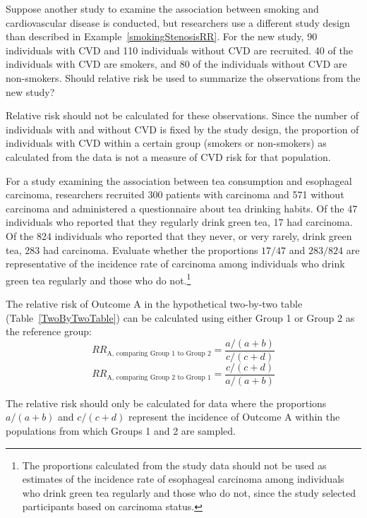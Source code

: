 \begin{example}{Suppose another study to examine the association between smoking and cardiovascular disease is conducted, but researchers use a different study design than described in Example~\ref{smokingStenosisRR}. For the new study, 90 individuals with CVD and 110 individuals without CVD are recruited. 40 of the individuals with CVD are smokers, and 80 of the individuals without CVD are non-smokers. Should relative risk be used to summarize the observations from the new study?}
	
Relative risk should not be calculated for these observations. Since the number of individuals with and without CVD is fixed by the study design, the proportion of individuals with CVD within a certain group (smokers or non-smokers) as calculated from the data is not a measure of CVD risk for that population.
\end{example}

\begin{exercise} For a study examining the association between tea consumption and esophageal carcinoma, researchers recruited 300 patients with carcinoma and 571 without carcinoma and administered a questionnaire about tea drinking habits. Of the 47 individuals who reported that they regularly drink green tea, 17 had carcinoma. Of the 824 individuals who reported that they never, or very rarely, drink green tea, 283 had carcinoma. Evaluate whether the proportions $17/47$ and $283/824$ are representative of the incidence rate of carcinoma among individuals who drink green tea regularly and those who do not.\footnote{The proportions calculated from the study data should not be used as estimates of the incidence rate of esophageal carcinoma among individuals who drink green tea regularly and those who do not, since the study selected participants based on carcinoma status.}
\end{exercise}


\begin{termBox}{%
		The relative risk of Outcome A in the hypothetical two-by-two table (Table~\ref{TwoByTwoTable}) can be calculated using either Group 1 or Group 2 as the reference group:
		\[RR_{\textrm{A, comparing Group 1 to Group 2}} = \dfrac{a/(a+b)}{c/(c+d)} \]
		\[RR_{\textrm{A, comparing Group 2 to Group 1}} = \dfrac{c/(c+d)}{a/(a+b)} \]
		
		The relative risk should only be calculated for data where the proportions $a/(a+b)$ and $c/(c+d)$ represent the incidence of Outcome A within the populations from which Groups 1 and 2 are sampled.
	} 
	
\end{termBox}

